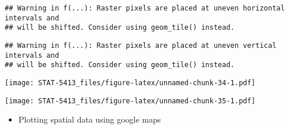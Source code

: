 \documentclass[]{book}
\newenvironment{Shaded}{\begin{snugshade}}{\end{snugshade}}
\newcommand{\CommentTok}[1]{\textcolor[rgb]{0.56,0.35,0.01}{\textit{#1}}}
\newcommand{\DataTypeTok}[1]{\textcolor[rgb]{0.13,0.29,0.53}{#1}}
\newcommand{\DecValTok}[1]{\textcolor[rgb]{0.00,0.00,0.81}{#1}}
\newcommand{\KeywordTok}[1]{\textcolor[rgb]{0.13,0.29,0.53}{\textbf{#1}}}
\newcommand{\NormalTok}[1]{#1}
\newcommand{\OperatorTok}[1]{\textcolor[rgb]{0.81,0.36,0.00}{\textbf{#1}}}
\newcommand{\StringTok}[1]{\textcolor[rgb]{0.31,0.60,0.02}{#1}}
\providecommand{\tightlist}{%
  \setlength{\itemsep}{0pt}\setlength{\parskip}{0pt}}
\begin{document}
\begin{Shaded}
\end{Shaded}

\begin{verbatim}
## Warning in f(...): Raster pixels are placed at uneven horizontal intervals and
## will be shifted. Consider using geom_tile() instead.
\end{verbatim}

\begin{verbatim}
## Warning in f(...): Raster pixels are placed at uneven vertical intervals and
## will be shifted. Consider using geom_tile() instead.
\end{verbatim}

\texttt{[image: STAT-5413\_files/figure-latex/unnamed-chunk-34-1.pdf]}

\begin{Shaded}
\end{Shaded}

\texttt{[image: STAT-5413\_files/figure-latex/unnamed-chunk-35-1.pdf]}

\begin{itemize}
\tightlist
\item
  Plotting spatial data using google maps
\end{itemize}
\end{document}
